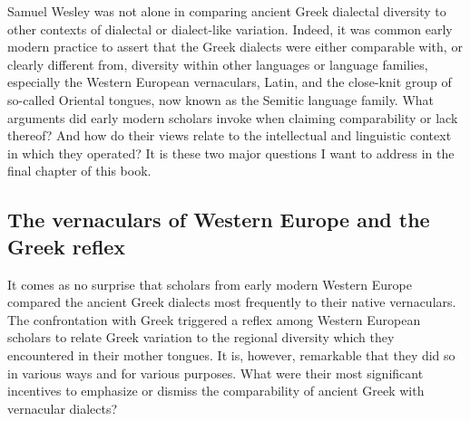 Samuel Wesley was not alone in comparing ancient Greek dialectal diversity to other contexts of dialectal or dialect-like variation. Indeed, it was common early modern practice to assert that the Greek dialects were either comparable with, or clearly different from, diversity within other languages or language families, especially the Western European vernaculars, Latin, and the close-knit group of so-called Oriental tongues, now known as the Semitic language family. What arguments did early modern scholars invoke when claiming comparability or lack thereof? And how do their views relate to the intellectual and linguistic context in which they operated? It is these two major questions I want to address in the final chapter of this book.

\subsection{The vernaculars of Western Europe and the Greek reflex}
\hypertarget{Toc19704858}{}
It comes as no surprise that scholars from early modern Western Europe compared the ancient Greek dialects most frequently to their native vernaculars. The confrontation with Greek triggered a reflex among Western European scholars to relate Greek variation to the regional diversity which they encountered in their mother tongues. It is, however, remarkable that they did so in various ways and for various purposes. What were their most significant incentives to emphasize or dismiss the comparability of ancient Greek with vernacular dialects?

